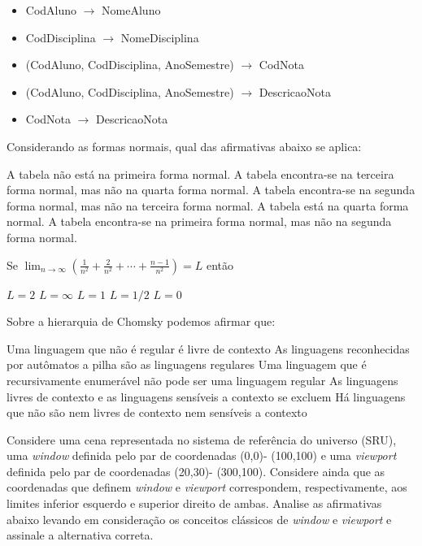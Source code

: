 \documentclass[12pt, addpoints]{exam}
\begin{document}
\begin{questions}
\begin{itemize}
    \item CodAluno \(\rightarrow\) NomeAluno

    \item CodDisciplina \(\rightarrow\) NomeDisciplina

    \item (CodAluno, CodDisciplina, AnoSemestre) \(\rightarrow\) CodNota

    \item (CodAluno, CodDisciplina, AnoSemestre) \(\rightarrow\) DescricaoNota

    \item CodNota \(\rightarrow\) DescricaoNota

\end{itemize}



Considerando as formas normais, qual das afirmativas abaixo se aplica:
\begin{choices}
\choice A tabela não está na primeira forma normal.
\choice A tabela encontra-se na terceira forma normal, mas não na quarta forma normal.
\choice A tabela encontra-se na segunda forma normal, mas não na terceira forma normal.
\choice A tabela está na quarta forma normal.
\choice A tabela encontra-se na primeira forma normal, mas não na segunda forma normal.
\end{choices}

\question

Se \( \lim_{n \to \infty} \left( \frac{1}{n^2} + \frac{2}{n^2} + \cdots + \frac{n-1}{n^2} \right) = L \) então


\begin{choices}
\choice \( L = 2 \)
\choice \( L = \infty \)
\choice \( L = 1 \)
\choice \( L = 1/2 \)
\choice \( L = 0 \)
\end{choices}

\question

Sobre a hierarquia de Chomsky podemos afirmar que:
\begin{choices}
\choice Uma linguagem que não é regular é livre de contexto
\choice As linguagens reconhecidas por autômatos a pilha são as linguagens regulares
\choice Uma linguagem que é recursivamente enumerável não pode ser uma linguagem regular
\choice As linguagens livres de contexto e as linguagens sensíveis a contexto se excluem
\choice Há linguagens que não são nem livres de contexto nem sensíveis a contexto
\end{choices}

\question

Considere uma cena representada no sistema de referência do universo (SRU), uma \textit{window} definida pelo par de coordenadas (0,0)- (100,100) e uma \textit{viewport} definida pelo par de coordenadas (20,30)- (300,100). Considere ainda que as coordenadas que definem \textit{window} e \textit{viewport} correspondem, respectivamente, aos limites inferior esquerdo e superior direito de ambas. Analise as afirmativas abaixo levando em consideração os conceitos clássicos de \textit{window} e \textit{viewport} e assinale a alternativa correta.




\end{questions}
\end{document}
